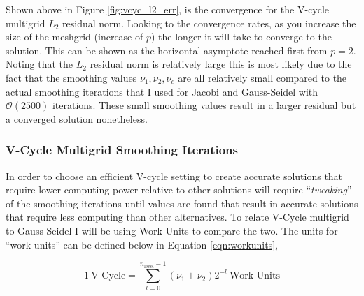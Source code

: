     Shown above in Figure \ref{fig:vcyc_l2_err}, is the convergence for the V-cycle multigrid $L_2$ residual norm. Looking to the convergence rates, as you increase the size of the meshgrid (increase of $p$) the longer it will take to converge to the solution. This can be shown as the horizontal asymptote reached first from $p=2$. Noting that the $L_2$ residual norm is relatively large this is most likely due to the fact that the smoothing values $\nu_1, \nu_2,\nu_c$ are all relatively small compared to the actual smoothing iterations that I used for Jacobi and Gauss-Seidel with $\mathcal{O}(2500)$ iterations. These small smoothing values result in a larger residual but a converged solution nonetheless.



    \pagebreak
    \subsubsection{V-Cycle Multigrid Smoothing Iterations}

    In order to choose an efficient V-cycle setting to create accurate solutions that require lower computing power relative to other solutions will require ``\textit{tweaking}'' of the smoothing iterations until values are found that result in accurate solutions that require less computing than other alternatives. To relate V-Cycle multigrid to Gauss-Seidel I will be using Work Units to compare the two. The units for ``work units'' can be defined below in Equation \ref{eqn:workunits},

        \begin{equation}
            1\ \text{V Cycle} = \sum_{l=0}^{n_\text{level}-1}\left(\nu_1 + \nu_2\right)2^{-l}\  \text{Work Units}
            \label{eqn:workunits}
        \end{equation}

